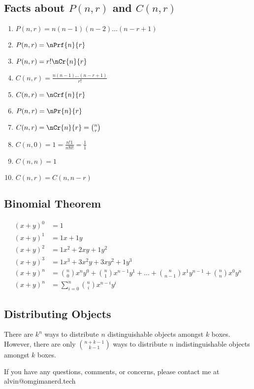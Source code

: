 \documentclass[letterpaper, 12pt]{math}
\begin{document}
\subsection*{Facts about \( P(n,r) \) and \( C(n,r) \)}
\begin{enumerate}
  \item \( P(n,r) = n(n-1)(n-2)\dots(n-r+1) \)
  \item \( P(n,r) = \nPrf{n}{r} \)
  \item \( P(n,r) = r!\nCr{n}{r} \)
  \item \( C(n,r) = \frac{n(n-1)\dots(n-r+1)}{r!} \)
  \item \( C(n,r) = \nCrf{n}{r} \)
  \item \( P(n,r) = {\nPr{n}{r}} \)
  \item \( C(n,r) = {\nCr{n}{r}} = \binom{n}{r} \)
  \item \( C(n,0) = 1 = \frac{n!1}{n!0!} = \frac{1}{1} \)
  \item \( C(n,n) = 1 \)
  \item \( C(n,r) = C(n,n-r) \)
\end{enumerate}

\subsection*{Binomial Theorem}
\begin{align*}
  (x+y)^{0} &= 1 \\
  (x+y)^{1} &= 1x+1y \\
  (x+y)^{2} &= 1x^{2}+2xy+1y^{2} \\
  (x+y)^{3} &= 1x^{3}+3x^{2}y+3xy^{2}+1y^{3} \\
  (x+y)^{n} &= \binom{n}{0}x^{n}y^{0}+\binom{n}{1}x^{n-1}y^{1}+\dots+
      \binom{n}{n-1}x^{1}y^{n-1}+\binom{n}{n}x^{0}y^{n} \\
  (x+y)^{n} &= \sum_{i=0}^{n}\binom{n}{i}x^{n-i}y^{i}
\end{align*}

\subsection*{Distributing Objects}
There are \( k^{n} \) ways to distribute \( n \) distinguishable objects amongst
\( k \) boxes. However, there are only \( \binom{n+k-1}{k-1} \) ways to
distribute \( n \) indistinguishable objects amongst \( k \) boxes.

\begin{center}
  If you have any questions, comments, or concerns, please contact me at
  alvin@omgimanerd.tech
\end{center}
\end{document}
